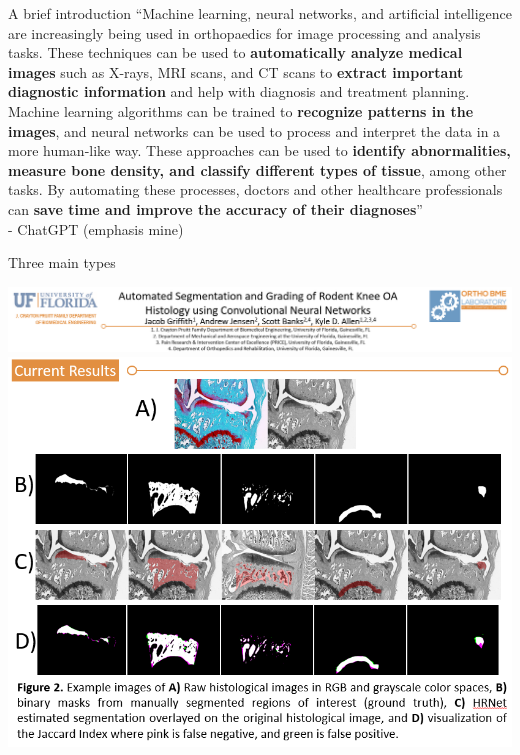 \begin{frame}{A brief introduction}
   ``Machine learning, neural networks, and artificial intelligence are increasingly being used in orthopaedics for image processing and analysis tasks. These techniques can be used to {\bf automatically analyze medical images} such as X-rays, MRI scans, and CT scans to {\bf extract important diagnostic information} and help with diagnosis and treatment planning. Machine learning algorithms can be trained to {\bf recognize patterns in the images}, and neural networks can be used to process and interpret the data in a more human-like way. These approaches can be used to {\bf identify abnormalities, measure bone density, and classify different types of tissue}, among other tasks. By automating these processes, doctors and other healthcare professionals can {\bf save time and improve the accuracy of their diagnoses}'' \\
\vspace{5mm}
   \hfill - ChatGPT (emphasis mine)
\end{frame}

\begin{frame}{Three main types}
   \begin{fullpageitemize}
         \item \centering {}
         \item \centering {}
         \item \centering {}
      \end{fullpageitemize}
\end{frame}


\begin{frame}
   \centering
      \includegraphics[width=\linewidth]{images/histology-title.png}
      \vfill
      \includegraphics[width=0.65\linewidth]{images/histology-images.png}
\end{frame}

